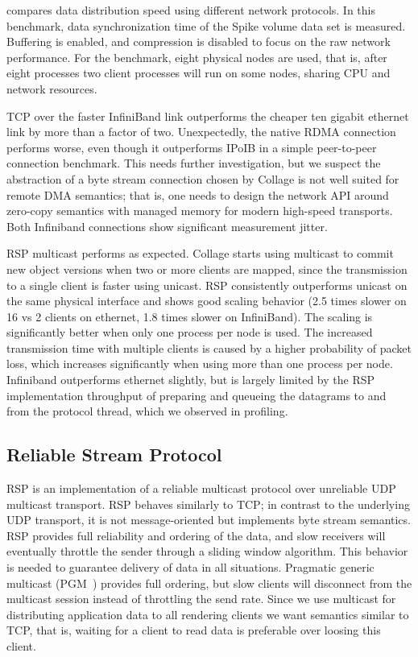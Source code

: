  compares data distribution speed using different network
protocols. In this benchmark, data synchronization time of the Spike volume
data set is measured. Buffering is enabled, and compression is disabled to
focus on the raw network performance. For the benchmark, eight physical nodes
are used, that is, after eight processes two client processes will run on some
nodes, sharing CPU and network resources.

TCP over the faster InfiniBand link outperforms the cheaper ten gigabit
ethernet link by more than a factor of two. Unexpectedly, the native RDMA
connection performs worse, even though it outperforms IPoIB in a simple
peer-to-peer connection benchmark. This needs further investigation, but we
suspect the abstraction of a byte stream connection chosen by Collage is not
well suited for remote DMA semantics; that is, one needs to design the network
API around zero-copy semantics with managed memory for modern high-speed
transports. Both Infiniband connections show significant measurement jitter.

RSP multicast performs as expected. Collage starts using multicast to commit
new object versions when two or more clients are mapped, since the transmission
to a single client is faster using unicast. RSP consistently outperforms
unicast on the same physical interface and shows good scaling behavior (2.5
times slower on 16 vs 2 clients on ethernet, 1.8 times slower on InfiniBand).
The scaling is significantly better when only one process per node is used. The
increased transmission time with multiple clients is caused by a higher
probability of packet loss, which increases significantly when using more than
one process per node. Infiniband outperforms ethernet slightly, but is largely
limited by the RSP implementation throughput of preparing and queueing the
datagrams to and from the protocol thread, which we observed in profiling.


\subsection{Reliable Stream Protocol}\label{sec:RSP}

RSP is an implementation of a reliable multicast protocol over unreliable UDP
multicast transport. RSP behaves similarly to TCP; in contrast to the underlying
UDP transport, it is not message-oriented but implements byte stream semantics.
RSP provides full reliability and ordering of the data, and slow receivers will
eventually throttle the sender through a sliding window algorithm. This behavior
is needed to guarantee delivery of data in all situations. Pragmatic generic
multicast (PGM~\cite{pgm}) provides full ordering, but slow clients will
disconnect from the multicast session instead of throttling the send rate. Since
we use multicast for distributing application data to all rendering clients we
want semantics similar to TCP, that is, waiting for a client to read data is
preferable over loosing this client.

